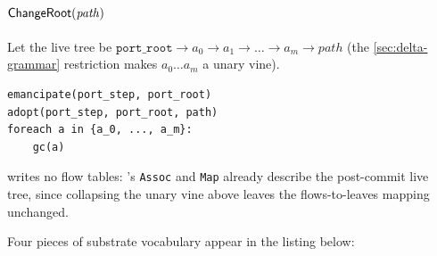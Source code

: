 
\paragraph*{\(\textsf{ChangeRoot}(\mathit{path})\)}
Let the live tree be \(\mathtt{port\_root} \to a_0 \to a_1 \to \ldots \to a_m \to \mathit{path}\) (the \cref{sec:delta-grammar} restriction makes \(a_0 \ldots a_m\) a unary vine).
\begin{Verbatim}
emancipate(port_step, port_root)
adopt(port_step, port_root, path)
foreach a in {a_0, ..., a_m}:
    gc(a)
\end{Verbatim}


\ChangeRoot{} writes no flow tables: \pth's \texttt{Assoc} and \texttt{Map} already describe the post-commit live tree, since collapsing the unary vine above \pth leaves the flows-to-leaves mapping unchanged.


Four pieces of substrate vocabulary appear in the listing below:

